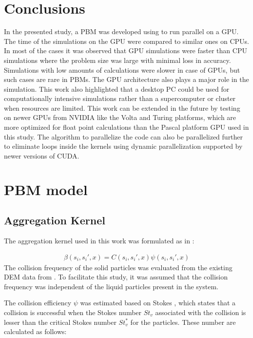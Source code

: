 \documentclass[preprint,10pt,authoryear,review]{elsarticle}
\begin{document}
\section{Conclusions}
\label{secConc}
In the presented study, a PBM was developed using to run parallel on a GPU. The time 
of the simulations on the GPU were compared to similar ones on CPUs. In most of the 
cases it was observed that GPU simulations were faster than CPU simulations where the 
problem size was large with minimal loss in accuracy. Simulations with low amounts 
of calculations were slower in case of GPUs, but such cases are rare in PBMs. 
The GPU architecture also plays a major role in the simulation. This work also 
highlighted that a desktop PC could be used for computationally intensive 
simulations rather than a supercomputer or cluster when resources are limited. 
This work can be extended in the future by testing on newer GPUs from NVIDIA 
like the Volta and Turing platforms, which are more optimized for float point calculations 
than the Pascal platform GPU used in this study. The algorithm to parallelize the code 
can also be parallelized further to eliminate loops inside the kernels using dynamic 
parallelization supported by newer versions of CUDA.

\appendix
\section{PBM model}
\label{app:A}
\subsection{Aggregation Kernel}
\label{app:aggKernel}

The aggregation kernel used in this work was formulated as in \cite{Barrasso2015ces}: 

\begin{align}
\beta(s_i,s_i',x)=C(s_i,s_i',x)\psi(s_i,s_i',x)
\label{eqn:mthds_pbm_beta_kernal}
\end{align}
The collision frequency of the solid particles was evaluated from the existing 
DEM data from \citep{Sampat2018}. To facilitate this study, it was assumed that
the collision frequency was independent of the liquid particles present in the 
system.

The collision efficiency $\psi$ was estimated based on Stokes , which 
states that a collision is successful when the Stokes number $St_v$ associated 
with the collision is lesser than the critical Stokes number ${St^*_v}$ for the 
particles. These number are calculated as follows:
\end{document}
